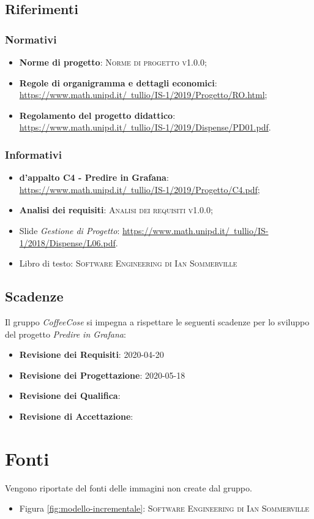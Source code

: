 \documentclass[../piano-di-progetto.tex]{subfiles}
\begin{document}
\subsection{Riferimenti}
\subsubsection{Normativi}
\begin{itemize}
  \item \textbf{Norme di progetto}: \textsc{Norme di progetto v1.0.0};
  \item \textbf{Regole di organigramma e dettagli economici}: \href{https://www.math.unipd.it/~tullio/IS-1/2019/Progetto/RO.html}{https://www.math.unipd.it/~tullio/IS-1/2019/Progetto/RO.html};
  \item \textbf{Regolamento del progetto didattico}: \href{https://www.math.unipd.it/~tullio/IS-1/2019/Dispense/PD01.pdf}{https://www.math.unipd.it/~tullio/IS-1/2019/Dispense/PD01.pdf}.
\end{itemize}

\subsubsection{Informativi}
\begin{itemize}
  \item \textbf{ d’appalto C4 - Predire in Grafana}: \href{https://www.math.unipd.it/~tullio/IS-1/2019/Progetto/C4.pdf}{https://www.math.unipd.it/~tullio/IS-1/2019/Progetto/C4.pdf};
  \item \textbf{Analisi dei requisiti}: \textsc{Analisi dei requisiti v1.0.0};
  \item Slide \emph{Gestione di Progetto}: \href{https://www.math.unipd.it/~tullio/IS-1/2018/Dispense/L06.pdf}{https://www.math.unipd.it/~tullio/IS-1/2018/Dispense/L06.pdf}.
  \item Libro di testo: \textsc{Software Engineering di Ian Sommerville}
\end{itemize}

\subsection{Scadenze}
\label{scadenze}
Il gruppo \emph{CoffeeCose} si impegna a rispettare le seguenti scadenze per lo sviluppo del progetto \emph{Predire in Grafana}:
\begin{itemize}
    \item \textbf{Revisione dei Requisiti}: 2020-04-20
    \item \textbf{Revisione dei Progettazione}: 2020-05-18
    \item \textbf{Revisione dei Qualifica}: %
    \item \textbf{Revisione di Accettazione}: %
\end{itemize}

\section{Fonti}
Vengono riportate del fonti delle immagini non create dal gruppo.
\begin{itemize}
    \item Figura \ref{fig:modello-incrementale}: \textsc{Software Engineering di Ian Sommerville}
\end{itemize}
\end{document}
